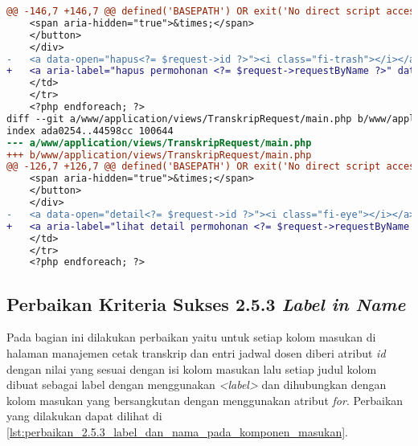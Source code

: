 \begin{lstlisting}[frame=single, label={lst:perbaikan_2.4.4_tautan_tanpa_keterangan}, language=diff, caption=Perbaikan Kriteria Sukses 2.4.4 - Tautan Tanpa Keterangan]
@@ -146,7 +146,7 @@ defined('BASEPATH') OR exit('No direct script access allowed');
    <span aria-hidden="true">&times;</span>
    </button>
    </div>
-   <a data-open="hapus<?= $request->id ?>"><i class="fi-trash"></i></a>
+   <a aria-label="hapus permohonan <?= $request->requestByName ?>" data-open="hapus<?= $request->id ?>"><i class="fi-trash"></i></a>
    </td>
    </tr>
    <?php endforeach; ?>
diff --git a/www/application/views/TranskripRequest/main.php b/www/application/views/TranskripRequest/main.php
index ada0254..44598cc 100644
--- a/www/application/views/TranskripRequest/main.php
+++ b/www/application/views/TranskripRequest/main.php
@@ -126,7 +126,7 @@ defined('BASEPATH') OR exit('No direct script access allowed');
    <span aria-hidden="true">&times;</span>
    </button>
    </div>
-   <a data-open="detail<?= $request->id ?>"><i class="fi-eye"></i></a>
+   <a aria-label="lihat detail permohonan <?= $request->requestByName ?>" data-open="detail<?= $request->id ?>"><i class="fi-eye"></i></a>
    </td>
    </tr>
    <?php endforeach; ?>
\end{lstlisting}

\subsection{Perbaikan Kriteria Sukses 2.5.3 \textit{Label in Name}}
\label{subsec:perbaikan_kriteria_sukses_2.5.3}
Pada bagian ini dilakukan perbaikan yaitu untuk setiap kolom masukan di halaman manajemen cetak transkrip dan entri jadwal dosen diberi atribut \textit{id} dengan nilai yang sesuai dengan isi kolom masukan lalu setiap judul kolom dibuat sebagai label dengan menggunakan \textit{<label>} dan dihubungkan dengan kolom masukan yang bersangkutan dengan menggunakan atribut \textit{for}. Perbaikan yang dilakukan dapat dilihat di \ref{lst:perbaikan_2.5.3_label_dan_nama_pada_komponen_masukan}.

